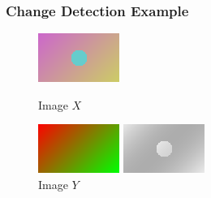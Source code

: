 \documentclass{beamer}
\begin{document}
\begin{frame}
  \frametitle{Change Detection Example}
  \begin{figure}
    \begin{minipage}[b]{0.40\linewidth}
      \centering
      \includegraphics[width=\textwidth]{./Images/GraphMatch/dataAfter.png}
      \caption{Image $X$}
    \end{minipage}
    \hfill
    \begin{minipage}[b]{0.40\linewidth}
      \centering
      \includegraphics[width=\textwidth]{./Images/GraphMatch/dataBefore.png}
      \caption{Image $Y$}
    \end{minipage}
    \vfill
    \begin{minipage}[b]{0.40\linewidth}
      \centering
      \includegraphics[width=\textwidth]{./Images/GraphMatch/naivediff.png}

\end{minipage}
\end{figure}
\end{frame}
\end{document}
